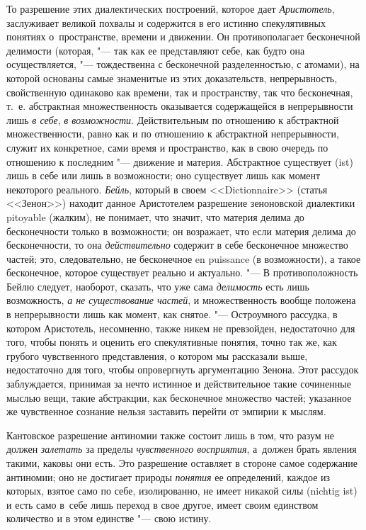 То разрешение этих диалектических построений, которое дает {\em Аристотель},
заслуживает великой похвалы и содержится в его истинно спекулятивных понятиях
о~пространстве, времени и движении. Он противополагает бесконечной делимости
(которая, "--- так как ее представляют себе, как будто она осуществляется, "---
тождественна с бесконечной разделенностью, с атомами), на которой основаны
самые знаменитые из этих доказательств, непрерывность, свойственную одинаково
как времени, так и пространству, так что бесконечная, т.~е. абстрактная
множественность оказывается содержащейся в непрерывности лишь {\em в себе},
{\em в возможности}. Действительным по отношению к абстрактной множественности,
равно как и по отношению к абстрактной непрерывности, служит их конкретное,
сами время и пространство, как в свою очередь по отношению к последним "---
движение и материя. Абстрактное существует (ist) лишь в себе или лишь в
возможности; оно существует лишь как момент некоторого реального. {\em Бейль},
который в своем <<Dictionnaire>> (статья <<Зенон>>) находит данное Аристотелем
разрешение зеноновской диалектики pitoyable (жалким), не понимает, что значит,
что материя делима до бесконечности только в возможности; он возражает, что
если материя делима до бесконечности, то она {\em действительно} содержит в
себе бесконечное множество частей; это, следовательно, не бесконечное en
puissance (в возможности), а такое бесконечное, которое существует реально и
актуально. "--- В противоположность Бейлю следует, наоборот, сказать, что уже
сама {\em делимость} есть лишь возможность, {\em а не существование частей},
и множественность вообще положена в непрерывности лишь как момент, как снятое.
"--- Остроумного рассудка, в котором Аристотель, несомненно, также никем не
превзойден, недостаточно для того, чтобы понять и оценить его спекулятивные
понятия, точно так же, как грубого чувственного представления, о котором мы
рассказали выше, недостаточно для того, чтобы опровергнуть аргументацию Зенона.
Этот рассудок заблуждается, принимая за нечто истинное и действительное такие
сочиненные мыслью вещи, такие абстракции, как бесконечное множество частей;
указанное же чувственное сознание нельзя заставить перейти от эмпирии к мыслям.

Кантовское разрешение антиномии также состоит лишь в том, что разум не должен
{\em залетать} за пределы {\em чувственного восприятия}, а~должен брать явления
такими, каковы они есть. Это разрешение оставляет в стороне самое содержание
антиномии; оно не достигает природы {\em понятия} ее определений, каждое из
которых, взятое само по себе, изолированно, не имеет никакой силы (nich\-tig
ist) и есть само в~себе лишь переход в свое другое, имеет своим единством
количество и в этом единстве "--- свою истину.\label{bkm:bm88b}

